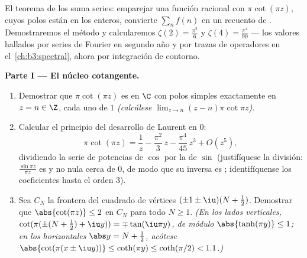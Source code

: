 \begin{problem}\label{pb:b3:residues:1}
El teorema de los  suma
series: emparejar una función racional con $\pi\cot(\pi z)$, cuyos polos
están en los enteros, convierte $\sum_{n}f(n)$ en un recuento de
. Demostraremos el
método y calcularemos $\zeta(2) = \frac{\pi^2}{6}$ y $\zeta(4) =
\frac{\pi^4}{90}$ --- los valores hallados por series de Fourier en
segundo año y por trazas de operadores en el~\cref{ch:b3:spectral},
ahora por integración de contorno.

\medskip
\noindent\textbf{Parte I --- El núcleo cotangente.}
\begin{enumerate}
  \item Demostrar que $\pi\cot(\pi z)$ es
   en $\C$ con polos
  simples exactamente en $z = n \in \Z$, cada uno de
   $1$ \emph{(calcúlese
        $\lim_{z\to n}(z-n)\pi\cot\pi z$)}.
  \item Calcular el principio del desarrollo de Laurent en $0$:
        \[
        \pi\cot(\pi z) = \frac1z - \frac{\pi^2}{3}\,z -
        \frac{\pi^4}{45}\,z^3 + O(z^5) ,
        \]
        dividiendo la serie de potencias de $\cos$ por la de $\sin$
        (justifíquese la división: $\frac{\sin\pi z}{\pi z}$ es
         y no nula cerca de
        $0$, de modo que su inversa es
        ; identifíquense los
        coeficientes hasta el orden $3$). \item Sea $C_N$ la frontera
        del cuadrado de vértices $(\pm1\pm\iu)(N + \frac12)$. Demostrar
        que $\abs{\cot(\pi z)} \leq 2$ en $C_N$ para todo $N \geq
        1$. \emph{(En los lados verticales, $\cot(\pi(\pm(N +
        \frac12) + \iu y)) = \mp\tan(\iu\pi y)$, de módulo
        $\abs{\tanh(\pi y)} \leq 1$; en los horizontales
        $\abs y = N + \frac12$, acótese
        $\abs{\cot(\pi(x\pm\iu y))} \leq \coth(\pi y) \leq
        \coth(\pi/2) < 1.1$.)}
\end{enumerate}


\end{problem}
